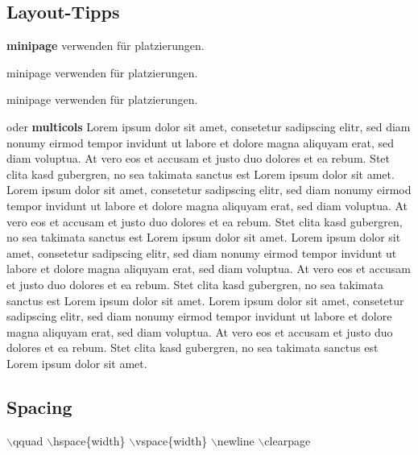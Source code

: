 \subsection{Layout-Tipps}
\begin{minipage}{0.5\linewidth}
    \textbf{minipage} verwenden für platzierungen.
\end{minipage}
\begin{minipage}{0.2\linewidth}
    minipage verwenden für platzierungen.
\end{minipage}
\begin{minipage}{0.3\linewidth}
    minipage verwenden für platzierungen.
\end{minipage}
\vspace{1cm}
\begin{multicols}{2}
    oder \textbf{multicols}\newline
    Lorem ipsum dolor sit amet, consetetur sadipscing elitr, sed diam nonumy eirmod tempor invidunt ut labore et dolore magna aliquyam erat, sed diam voluptua. At vero eos et accusam et justo duo dolores et ea rebum. Stet clita kasd gubergren, no sea takimata sanctus est Lorem ipsum dolor sit amet. Lorem ipsum dolor sit amet, consetetur sadipscing elitr, sed diam nonumy eirmod tempor invidunt ut labore et dolore magna aliquyam erat, sed diam voluptua. At vero eos et accusam et justo duo dolores et ea rebum. Stet clita kasd gubergren, no sea takimata sanctus est Lorem ipsum dolor sit amet.
    \columnbreak
    Lorem ipsum dolor sit amet, consetetur sadipscing elitr, sed diam nonumy eirmod tempor invidunt ut labore et dolore magna aliquyam erat, sed diam voluptua. At vero eos et accusam et justo duo dolores et ea rebum. Stet clita kasd gubergren, no sea takimata sanctus est Lorem ipsum dolor sit amet. Lorem ipsum dolor sit amet, consetetur sadipscing elitr, sed diam nonumy eirmod tempor invidunt ut labore et dolore magna aliquyam erat, sed diam voluptua. At vero eos et accusam et justo duo dolores et ea rebum. Stet clita kasd gubergren, no sea takimata sanctus est Lorem ipsum dolor sit amet.
\end{multicols}

\subsection{Spacing}
    $\backslash$qquad \newline
    $\backslash$hspace\{width\}\newline
    $\backslash$vspace\{width\}\newline
    $\backslash$newline\newline
    $\backslash$clearpage\newline
    \clearpage
